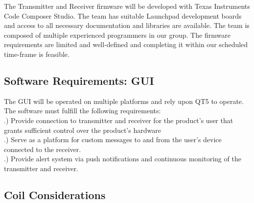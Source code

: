\documentclass[12pt]{article}
\begin{document}
\indent
The Transmitter and Receiver firmware will be developed with Texas Instruments Code Composer Studio. The team has suitable Launchpad development boards and access to all necessary documentation and libraries are available. The team is composed of multiple experienced programmers in our group. The firmware requirements are limited and well-defined and completing it within our scheduled time-frame is feasible.


\subsection{Software Requirements: GUI}

The GUI will be operated on multiple platforms and rely upon QT5 to operate.  The software must fulfill the following requirements:\\

.) Provide connection to transmitter and receiver for the product's user that grants sufficient control over the product's hardware\\

.) Serve as a platform for custom messages to and from the user's device connected to the receiver.\\

.) Provide alert system via push notifications and continuous monitoring of the transmitter and receiver.\\

\pagebreak

\subsection{Coil Considerations}
\end{document}
